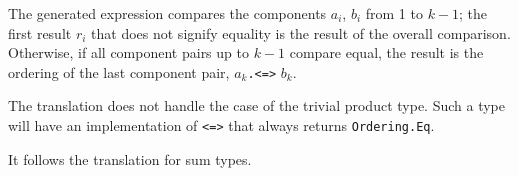 The generated expression compares the components $a_i$, $b_i$ from 1 to $k-1$; the first result $r_i$ that does not signify equality is the result of the overall comparison. Otherwise, if all component pairs up to ${k-1}$ compare equal, the result is the ordering of the last component pair, $a_k$\texttt{.<=>} $b_k$.

The translation does not handle the case of the trivial product type. Such a type will have an implementation of \texttt{<=>} that always returns \texttt{Ordering.Eq}.

It follows the translation for sum types.

